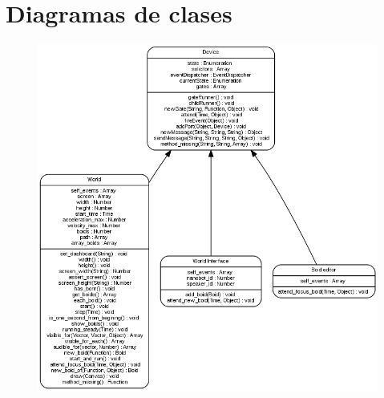 \section{Diagramas de clases}
\label{section:diagramas}

\begin{figure}[H]
 \centering
 \includegraphics[scale=0.5]{../images/device_diagram.png}

 \label{fig:../images/device_diagram.png}
\end{figure}

